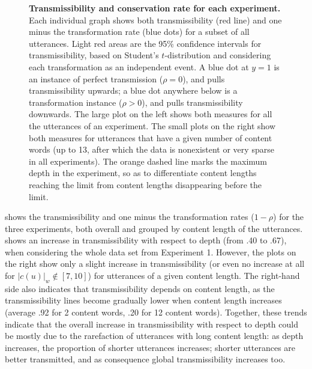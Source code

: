 \documentclass[a4paper,fleqn]{cas-dc}
\begin{document}
\begin{figure}
  \centering


  \caption[Transmissibility and conservation rate for each experiment]{
  \textbf{Transmissibility and conservation rate for each experiment.}
  Each individual graph shows both transmissibility (red line) and one minus the transformation rate (blue dots) for a subset of all utterances.
  Light red areas are the 95\% confidence intervals for transmissibility, based on Student's $t$-distribution and considering each transformation as an independent event.
  A blue dot at $y = 1$ is an instance of perfect transmission ($\rho = 0$), and pulls transmissibility upwards;
  a blue dot anywhere below is a transformation instance ($\rho > 0$), and pulls transmissibility downwards.
  The large plot on the left shows both measures for all the utterances of an experiment.
  The small plots on the right show both measures for utterances that have a given number of content words (up to 13, after which the data is nonexistent or very sparse in all experiments).
  The orange dashed line marks the maximum depth in the experiment, so as to differentiate content lengths reaching the limit from content lengths disappearing before the limit.
  }
  \label{fig:gistr-octrans}
\end{figure}

 shows the transmissibility and one minus the
transformation rates (\(1 - \rho\)) for the three experiments, both
overall and grouped by content length of the utterances.
 shows an increase in transmissibility
with respect to depth (from .40 to .67), when considering the whole data
set from Experiment 1. However, the plots on the right show only a
slight increase in transmissibility (or even no increase at all for
\(|c(u)|_w \notin [7, 10]\)) for utterances of a given content length.
The right-hand side also indicates that transmissibility depends on
content length, as the transmissibility lines become gradually lower
when content length increases (average .92 for 2 content words, .20 for
12 content words). Together, these trends indicate that the overall
increase in transmissibility with respect to depth could be mostly due
to the rarefaction of utterances with long content length: as depth
increases, the proportion of shorter utterances increases; shorter
utterances are better transmitted, and as consequence global
transmissibility increases too.
\end{document}
